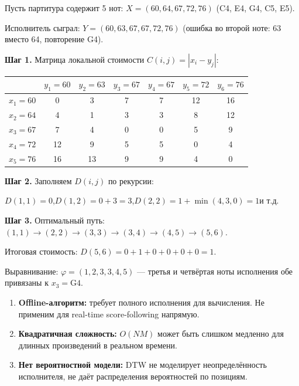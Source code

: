 \documentclass[a4paper,11pt]{article}
\begin{document}
\begin{exbox}[title={DTW: числовой пример}]
Пусть партитура содержит 5 нот: $X = (60, 64, 67, 72, 76)$ (C4, E4, G4, C5, E5).

Исполнитель сыграл: $Y = (60, 63, 67, 67, 72, 76)$ (ошибка во второй ноте:
63 вместо 64, повторение G4).

\medskip
\textbf{Шаг 1.} Матрица локальной стоимости $C(i,j) = |x_i - y_j|$:

\begin{center}
\begin{tabular}{c|cccccc}
  & $y_1{=}60$ & $y_2{=}63$ & $y_3{=}67$ & $y_4{=}67$ & $y_5{=}72$ & $y_6{=}76$ \\
\midrule
$x_1{=}60$ & 0 & 3 & 7 & 7 & 12 & 16 \\
$x_2{=}64$ & 4 & 1 & 3 & 3 & 8  & 12 \\
$x_3{=}67$ & 7 & 4 & 0 & 0 & 5  & 9 \\
$x_4{=}72$ & 12& 9 & 5 & 5 & 0  & 4 \\
$x_5{=}76$ & 16& 13& 9 & 9 & 4  & 0 \\
\end{tabular}
\end{center}

\textbf{Шаг 2.} Заполняем $D(i,j)$ по рекурсии:

$D(1,1) = 0$,\quad $D(1,2) = 0 + 3 = 3$,\quad $D(2,2) = 1 + \min(4, 3, 0) = 1$\quad и т.д.

\textbf{Шаг 3.} Оптимальный путь: $(1,1) \to (2,2) \to (3,3) \to (3,4) \to (4,5) \to (5,6)$.

Итоговая стоимость: $D(5,6) = 0 + 1 + 0 + 0 + 0 + 0 = 1$.

Выравнивание: $\varphi = (1, 2, 3, 3, 4, 5)$ --- третья и четвёртая ноты
исполнения обе привязаны к $x_3 = \text{G4}$.
\end{exbox}

\begin{warnbox}[title={Ограничения DTW}]
\begin{enumerate}[leftmargin=1.5em]
  \item \textbf{Offline-алгоритм:} требует полного исполнения для вычисления.
        Не применим для real-time score-following напрямую.
  \item \textbf{Квадратичная сложность:} $O(NM)$ может быть слишком медленно
        для длинных произведений в реальном времени.
  \item \textbf{Нет вероятностной модели:} DTW не моделирует неопределённость
        исполнителя, не даёт распределения вероятностей по позициям.
\end{enumerate}
\end{warnbox}
\end{document}
